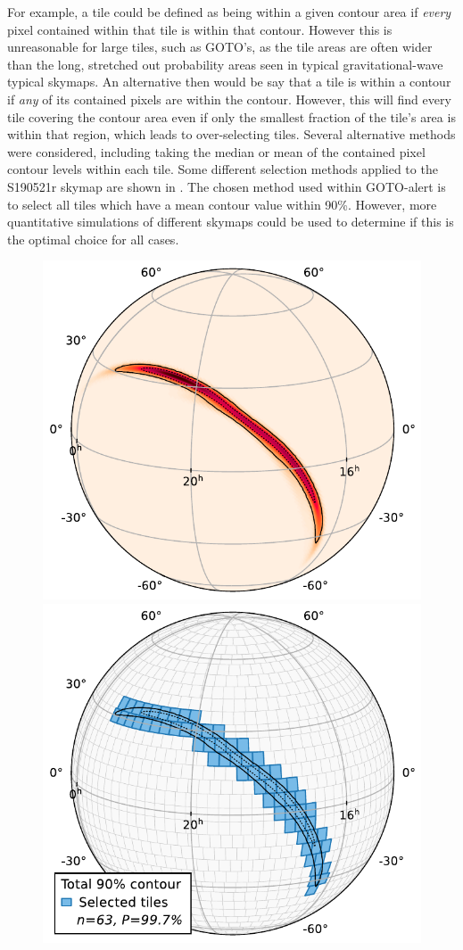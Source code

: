 \begin{colsection}
\begin{colsection}
For example, a tile could be defined as being within a given contour area if \textit{every} pixel contained within that tile is within that contour. However this is unreasonable for large tiles, such as GOTO's, as the tile areas are often wider than the long, stretched out probability areas seen in typical gravitational-wave typical skymaps. An alternative then would be say that a tile is within a contour if \textit{any} of its contained pixels are within the contour. However, this will find every tile covering the contour area even if only the smallest fraction of the tile's area is within that region, which leads to over-selecting tiles. Several alternative methods were considered, including taking the median or mean of the contained pixel contour levels within each tile. Some different selection methods applied to the S190521r skymap are shown in . The chosen method used within GOTO-alert is to select all tiles which have a mean contour value within 90\%. However, more quantitative simulations of different skymaps could be used to determine if this is the optimal choice for all cases.

\begin{figure}[p]
    \begin{center}
        \includegraphics[width=0.49\linewidth]{images/tiling/S190521r_1.pdf}
        \includegraphics[width=0.49\linewidth]{images/tiling/S190521r_2.pdf}


\end{center}
\end{figure}
\end{colsection}
\end{colsection}
